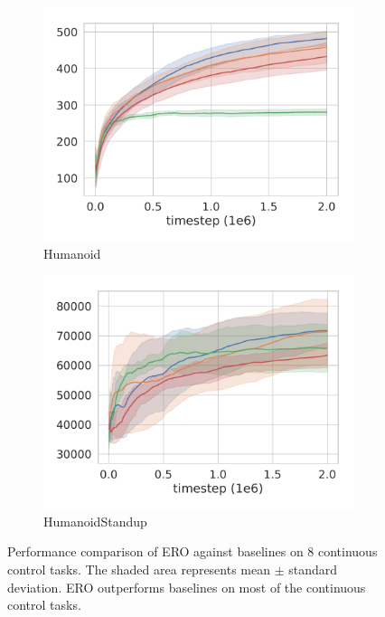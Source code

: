 \documentclass{article}
\begin{document}
\begin{figure}
\begin{subfigure}[b]{0.25\textwidth}
    \includegraphics[width=\textwidth]{Humanoid-v2.pdf}
    \caption{Humanoid}
  \end{subfigure}%
  \begin{subfigure}[b]{0.25\textwidth}
    \includegraphics[width=\textwidth]{HumanoidStandup-v2.pdf}
    \caption{HumanoidStandup}
  \end{subfigure}%
  \caption{Performance comparison of ERO against baselines on 8 continuous control tasks. The shaded area represents mean $\pm$ standard deviation. ERO outperforms baselines on most of the continuous control tasks.}
  \label{label:performance}
\end{figure}
\end{document}
